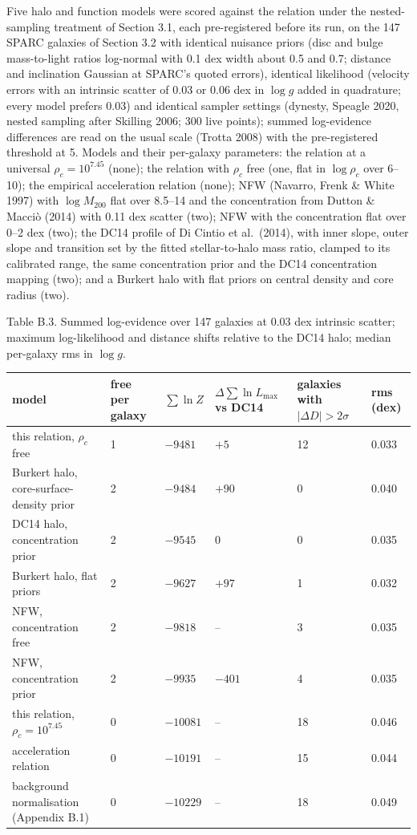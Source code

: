 \documentclass[
  10pt,
]{article}
\begin{document}
Five halo and function models were scored against the relation under the nested-sampling treatment of Section 3.1, each pre-registered before its run, on the 147 SPARC galaxies of Section 3.2 with identical nuisance priors (disc and bulge mass-to-light ratios log-normal with 0.1 dex width about 0.5 and 0.7; distance and inclination Gaussian at SPARC's quoted errors), identical likelihood (velocity errors with an intrinsic scatter of 0.03 or 0.06 dex in $\log g$ added in quadrature; every model prefers 0.03) and identical sampler settings (dynesty, Speagle 2020, nested sampling after Skilling 2006; 300 live points); summed log-evidence differences are read on the usual scale (Trotta 2008) with the pre-registered threshold at 5. Models and their per-galaxy parameters: the relation at a universal $\rho_c=10^{7.45}$ (none); the relation with $\rho_c$ free (one, flat in $\log\rho_c$ over 6--10); the empirical acceleration relation (none); NFW (Navarro, Frenk \& White 1997) with $\log M_{200}$ flat over 8.5--14 and the concentration from Dutton \& Macci\`o (2014) with 0.11 dex scatter (two); NFW with the concentration flat over 0--2 dex (two); the DC14 profile of Di Cintio et al.~(2014), with inner slope, outer slope and transition set by the fitted stellar-to-halo mass ratio, clamped to its calibrated range, the same concentration prior and the DC14 concentration mapping (two); and a Burkert halo with flat priors on central density and core radius (two).

Table B.3. Summed log-evidence over 147 galaxies at 0.03 dex intrinsic scatter; maximum log-likelihood and distance shifts relative to the DC14 halo; median per-galaxy rms in $\log g$.

\begin{longtable}[]{@{}p{4.9cm}p{1.6cm}p{1.6cm}p{2.1cm}p{2.0cm}p{1.6cm}@{}}
\toprule
model & free per galaxy & $\sum\ln Z$ & $\Delta\sum\ln L_{\max}$ vs DC14 & galaxies with $|\Delta D|>2\sigma$ & rms (dex)\tabularnewline
\midrule
\endhead
this relation, $\rho_c$ free & 1 & $-9481$ & $+5$ & 12 & 0.033\tabularnewline
Burkert halo, core-surface-density prior & 2 & $-9484$ & $+90$ & 0 & 0.040\tabularnewline
DC14 halo, concentration prior & 2 & $-9545$ & 0 & 0 & 0.035\tabularnewline
Burkert halo, flat priors & 2 & $-9627$ & $+97$ & 1 & 0.032\tabularnewline
NFW, concentration free & 2 & $-9818$ & -- & 3 & 0.035\tabularnewline
NFW, concentration prior & 2 & $-9935$ & $-401$ & 4 & 0.035\tabularnewline
this relation, $\rho_c=10^{7.45}$ & 0 & $-10081$ & -- & 18 & 0.046\tabularnewline
acceleration relation & 0 & $-10191$ & -- & 15 & 0.044\tabularnewline
background normalisation (Appendix B.1) & 0 & $-10229$ & -- & 18 & 0.049\tabularnewline
\bottomrule
\end{longtable}
\end{document}
